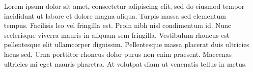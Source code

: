 Lorem ipsum dolor sit amet, consectetur adipiscing elit, sed do eiusmod tempor incididunt ut labore et dolore magna aliqua. Turpis massa sed elementum tempus. Facilisis leo vel fringilla est. Proin nibh nisl condimentum id. Nunc scelerisque viverra mauris in aliquam sem fringilla. Vestibulum rhoncus est pellentesque elit ullamcorper dignissim. Pellentesque massa placerat duis ultricies lacus sed. Urna porttitor rhoncus dolor purus non enim praesent. Maecenas ultricies mi eget mauris pharetra. At volutpat diam ut venenatis tellus in metus.
